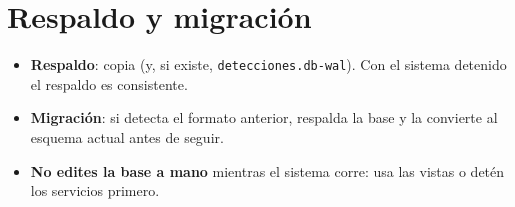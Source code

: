 \section{Respaldo y migración}

\begin{itemize}
  \item \textbf{Respaldo}: copia  (y, si existe,
        \texttt{detecciones.db-wal}). Con el sistema detenido el respaldo es
        consistente.
  \item \textbf{Migración}: si  detecta el formato anterior,
        respalda la base y la convierte al esquema actual antes de seguir.
  \item \textbf{No edites la base a mano} mientras el sistema corre: usa las
        vistas o detén los servicios primero.
\end{itemize}
